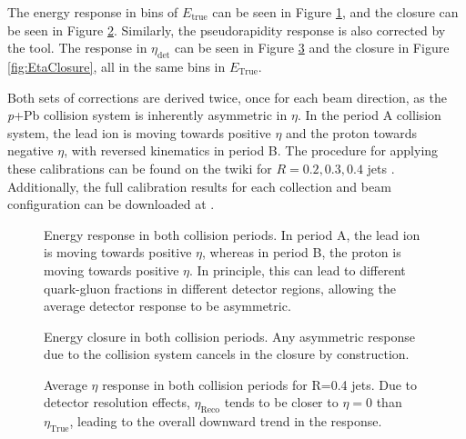\documentclass[NOTE, atlasdraft=true, texlive=2016, USenglish]{\ATLASLATEXPATH atlasdoc}
\begin{document}
The energy response in bins of $E_{\text{true}}$ can be seen in Figure \ref{fig:EnergyResponse}, and the closure can be seen in Figure \ref{fig:EnergyClosure}. Similarly, the pseudorapidity response is also corrected by the tool. The response in $\eta_{\text{det}}$ can be seen in Figure \ref{fig:EtaResponse} and the closure in Figure \ref{fig:EtaClosure}, all in the same bins in $E_{\text{True}}$.\par
Both sets of corrections are derived twice, once for each beam direction, as the \textit{p}+Pb collision system is inherently asymmetric in $\eta$. In the period A collision system, the lead ion is moving towards positive $\eta$ and the proton towards negative $\eta$, with reversed kinematics in period B. The procedure for applying these calibrations can be found on the twiki for $R=0.2, 0.3, 0.4$ jets \cite{HIRun2JESdata2016}. Additionally, the full calibration results for each collection and beam configuration can be downloaded at \cite{pPbR4,pPbR3,pPbR2,PbpR4,PbpR3,PbpR2}.

\begin{figure}[htbp]
	\centering
	\caption{Energy response in both collision periods. In period A, the lead ion is moving towards positive $\eta$, whereas in period B, the proton is moving towards positive $\eta$. In principle, this can lead to different quark-gluon fractions in different detector regions, allowing the average detector response to be asymmetric.}
	\label{fig:EnergyResponse}
\end{figure}

\begin{figure}[htbp]
	\centering
	\caption{Energy closure in both collision periods. Any asymmetric response due to the collision system cancels in the closure by construction.}
	\label{fig:EnergyClosure}
\end{figure}

\begin{figure}[htbp]
	\centering
	\caption{Average $\eta$ response in both collision periods for R=0.4 jets. Due to detector resolution effects, $\eta_{\text{Reco}}$ tends to be closer to $\eta = 0$ than $\eta_{\text{True}}$, leading to the overall downward trend in the response.}
	\label{fig:EtaResponse}
\end{figure}
\end{document}
